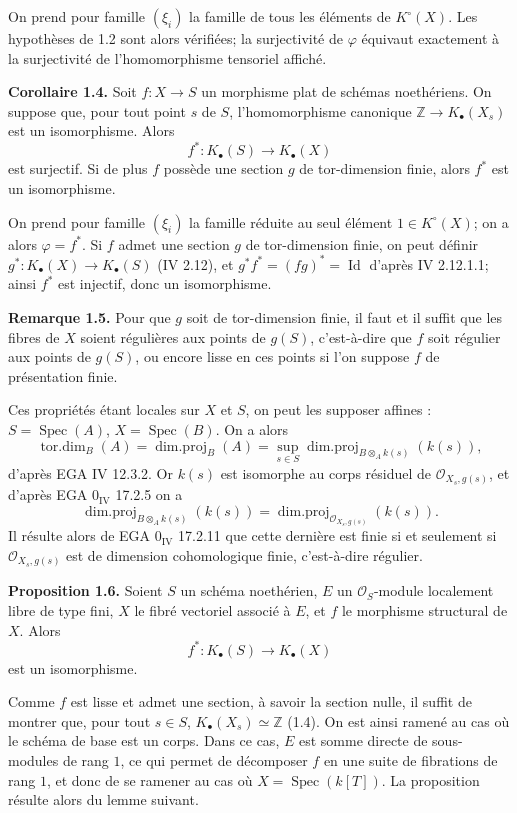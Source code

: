 \documentclass[11pt]{article}
\newcommand{\Spec}{\operatorname{Spec}}
\begin{document}
On prend pour famille $(\xi_i)$ la famille de tous les éléments de $K^\circ(X)$. Les hypothèses de 1.2 sont alors vérifiées; la surjectivité de $\varphi$ équivaut exactement à la surjectivité de l'homomorphisme tensoriel affiché.

\textbf{Corollaire 1.4.} Soit $f:X\to S$ un morphisme plat de schémas noethériens. On suppose que, pour tout point $s$ de $S$, l'homomorphisme canonique $\mathbb Z\to K_\bullet(X_s)$ est un isomorphisme. Alors
\[
f^*:K_\bullet(S)\longrightarrow K_\bullet(X)
\]
est surjectif. Si de plus $f$ possède une section $g$ de tor-dimension finie, alors $f^*$ est un isomorphisme.

On prend pour famille $(\xi_i)$ la famille réduite au seul élément $1\in K^\circ(X)$; on a alors $\varphi=f^*$. Si $f$ admet une section $g$ de tor-dimension finie, on peut définir $g^*:K_\bullet(X)\to K_\bullet(S)$ (IV 2.12), et $g^*f^*=(fg)^*=\operatorname{Id}$ d'après IV 2.12.1.1; ainsi $f^*$ est injectif, donc un isomorphisme.

\textbf{Remarque 1.5.} Pour que $g$ soit de tor-dimension finie, il faut et il suffit que les fibres de $X$ soient régulières aux points de $g(S)$, c'est-à-dire que $f$ soit régulier aux points de $g(S)$, ou encore lisse en ces points si l'on suppose $f$ de présentation finie.

Ces propriétés étant locales sur $X$ et $S$, on peut les supposer affines : $S=\Spec(A)$, $X=\Spec(B)$. On a alors
\[
\operatorname{tor.dim}_B(A)=\operatorname{dim.proj}_B(A)=\sup_{s\in S}\operatorname{dim.proj}_{B\otimes_A k(s)}(k(s)),
\]
d'après EGA IV 12.3.2. Or $k(s)$ est isomorphe au corps résiduel de $\mathcal O_{X_s,g(s)}$, et d'après EGA $0_{\mathrm{IV}}$ 17.2.5 on a
\[
\operatorname{dim.proj}_{B\otimes_A k(s)}(k(s))=
\operatorname{dim.proj}_{\mathcal O_{X_s,g(s)}}(k(s)).
\]
Il résulte alors de EGA $0_{\mathrm{IV}}$ 17.2.11 que cette dernière est finie si et seulement si $\mathcal O_{X_s,g(s)}$ est de dimension cohomologique finie, c'est-à-dire régulier.

\textbf{Proposition 1.6.} Soient $S$ un schéma noethérien, $E$ un $\mathcal O_S$-module localement libre de type fini, $X$ le fibré vectoriel associé à $E$, et $f$ le morphisme structural de $X$. Alors
\[
f^*:K_\bullet(S)\longrightarrow K_\bullet(X)
\]
est un isomorphisme.

Comme $f$ est lisse et admet une section, à savoir la section nulle, il suffit de montrer que, pour tout $s\in S$, $K_\bullet(X_s)\simeq \mathbb Z$ (1.4). On est ainsi ramené au cas où le schéma de base est un corps. Dans ce cas, $E$ est somme directe de sous-modules de rang $1$, ce qui permet de décomposer $f$ en une suite de fibrations de rang $1$, et donc de se ramener au cas où $X=\Spec(k[T])$. La proposition résulte alors du lemme suivant.
\end{document}
